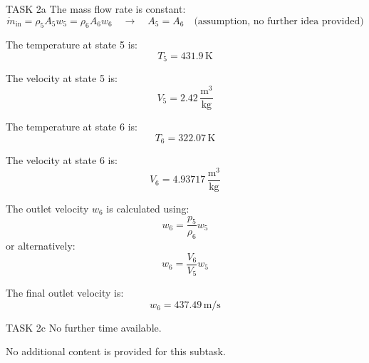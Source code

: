 TASK 2a  
The mass flow rate is constant:  
\[
\dot{m}_{\text{in}} = \rho_5 A_5 w_5 = \rho_6 A_6 w_6 \quad \rightarrow \quad A_5 = A_6 \quad \text{(assumption, no further idea provided)}
\]  

The temperature at state 5 is:  
\[
T_5 = 431.9 \, \text{K}
\]  

The velocity at state 5 is:  
\[
V_5 = 2.42 \, \frac{\text{m}^3}{\text{kg}}
\]  

The temperature at state 6 is:  
\[
T_6 = 322.07 \, \text{K}
\]  

The velocity at state 6 is:  
\[
V_6 = 4.93717 \, \frac{\text{m}^3}{\text{kg}}
\]  

The outlet velocity \( w_6 \) is calculated using:  
\[
w_6 = \frac{p_5}{\rho_6} w_5
\]  
or alternatively:  
\[
w_6 = \frac{V_6}{V_5} w_5
\]  

The final outlet velocity is:  
\[
w_6 = 437.49 \, \text{m/s}
\]  

TASK 2c  
No further time available.  

No additional content is provided for this subtask.
